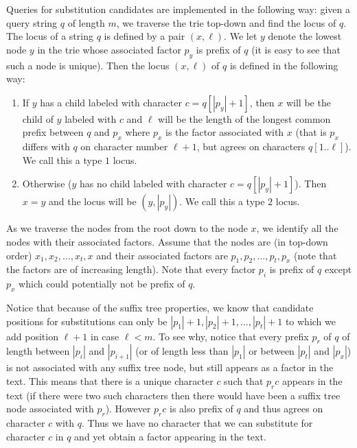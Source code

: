 \documentclass{article}
\newcommand{\?}{\mskip1.5mu}
\begin{document}
Queries for substitution candidates are implemented in the following way: given a query string $q$ of length $m$, we traverse the trie top-down and find the locus of $q$. The locus of a string $q$ is defined by a pair $(x,\ell)$. We let $y$ denote the lowest node $y$ in the trie whose associated factor $p_y$ is prefix of $q$ (it is easy to see that such a node is unique). Then the locus $(x,\ell)$ of $q$ is defined in the following way: 
\begin{enumerate}
\item If $y$ has a child labeled with character $c=q[|p_y|+1]$, then $x$ will be the child of $y$ labeled with $c$ and $\ell$ will be the length of the longest common prefix between $q$ and $p_x$ where $p_x$ is the factor associated with $x$ (that is $p_x$ differs with $q$ on character number $\ell+1$, but agrees on characters $q[1..\ell]$). We call this a type $1$ locus. 
\item Otherwise ($y$ has no child labeled with character $c=q[|p_y|+1]$). Then $x=y$ and the locus will be $(y,|p_y|)$. We call this a type $2$ locus. 
\end{enumerate}
As we traverse the nodes from the root down to the node $x$, we identify all the nodes with their associated factors. Assume that the nodes are (in top-down order) $x_1,x_2,\ldots,x_t,x$ and their associated factors are $p_1,p_2,\ldots,p_t,p_x$ (note that the factors are of increasing length). Note that every factor $p_i$ is prefix of $q$ except $p_x$ which could potentially not be prefix of $q$. 

Notice that because of the suffix tree properties, we know that candidate positions for substitutions can only be $|p_1|+1,|p_2|+1,\ldots,|p_t|+1$ to which we add position $\ell+1$ in case $\ell<m$. To see why, notice that every prefix $p_r$ of $q$ of length between $|p_i|$ and $|p_{i+1}|$ (or of length less than $|p_1|$ or  between $|p_t|$ and $|p_x|$) is not associated with any suffix tree node, but still appears as a factor in the text. This means that there is a unique character $c$ such that $p_rc$ appears in the text (if there were two such characters then there would have been a suffix tree node associated with $p_r$). However $p_rc$ is also prefix of $q$ and thus agrees on character $c$ with $q$. Thus we have no character that we can substitute for character $c$ in $q$ and yet obtain a factor appearing in the text. 
\end{document}
